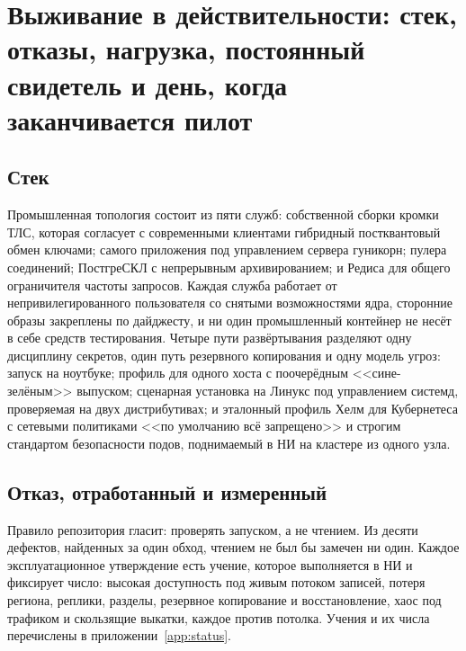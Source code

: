\section{Выживание в действительности: стек, отказы, нагрузка, постоянный свидетель и день, когда заканчивается пилот}
\label{sec:operations}



\subsection{Стек}

Промышленная топология состоит из пяти служб: собственной сборки кромки ТЛС, которая согласует с
современными клиентами гибридный постквантовый обмен ключами; самого приложения под управлением
сервера гуникорн; пулера соединений; ПостгреСКЛ с непрерывным архивированием; и Редиса для общего
ограничителя частоты запросов. Каждая служба работает от непривилегированного пользователя со
снятыми возможностями ядра, сторонние образы закреплены по дайджесту, и ни один промышленный
контейнер не несёт в себе средств тестирования. Четыре пути развёртывания разделяют одну
дисциплину секретов, один путь резервного копирования и одну модель угроз: запуск на ноутбуке;
профиль для одного хоста с поочерёдным <<сине-зелёным>> выпуском; сценарная установка на Линукс под
управлением системд, проверяемая на двух дистрибутивах; и эталонный профиль Хелм для Кубернетеса
с сетевыми политиками <<по умолчанию всё запрещено>> и строгим стандартом безопасности подов,
поднимаемый в НИ на кластере из одного узла. \sImpl

\subsection{Отказ, отработанный и измеренный}

Правило репозитория гласит: проверять запуском, а не чтением. Из десяти дефектов, найденных за
один обход, чтением не был бы замечен ни один. Каждое эксплуатационное утверждение есть учение, которое выполняется в НИ и
фиксирует число: высокая доступность под живым потоком записей, потеря региона, реплики,
разделы, резервное копирование и восстановление, хаос под трафиком и скользящие выкатки, каждое
против потолка. Учения и их числа перечислены в приложении~\ref{app:status}.


